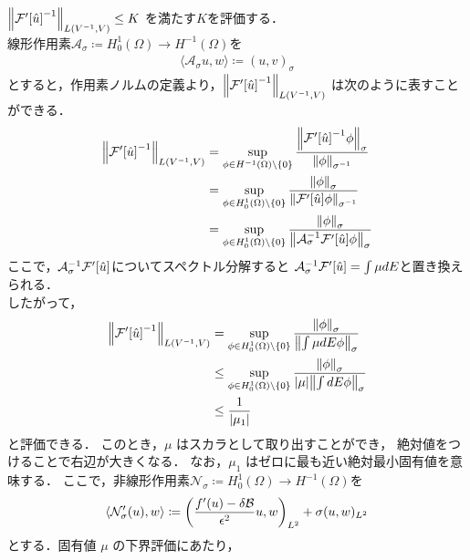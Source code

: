 \(\norm{\mathcal{F}'\qty[\hat{u}]^{-1}}_{L(V^{-1},V )} \leq K\)
を満たす\(K\)を評価する．\\
線形作用素\(\mathcal{A}_\sigma\coloneqq H^1_0(\Omega)\rightarrow H^{-1}(\Omega)\)を
\begin{align}
   \langle \mathcal{A}_\sigma u , w \rangle 
   \coloneqq (u,v)_{\sigma}
\end{align}
とすると，作用素ノルムの定義より，\(\norm{\mathcal{F}'\qty[\hat{u}]^{-1}}_{L(V^{-1},V )} \)
は次のように表すことができる．
\begin{align}
    \norm{\mathcal{F}'\qty[\hat{u}]^{-1}}_{L(V^{-1},V )} 
    &=
    \sup\limits_{\phi \in H^{-1}(\Omega) \backslash \{ 0 \} }
    \dfrac{\norm{\mathcal{F}'\qty[\hat{u}]^{-1}\phi}_\sigma }{\norm{\phi}_{\sigma ^{-1}}}\\
    &=
    \sup\limits_{\phi \in H^1_0 (\Omega)\backslash \{ 0 \} }
    \dfrac{\norm{\phi}_\sigma }{\norm{\mathcal{F}'\qty[\hat{u}]\phi}_{\sigma ^{-1}}}\\
    &=
    \sup\limits_{\phi \in H^1_0 (\Omega)\backslash \{ 0 \} }
    \dfrac{\norm{\phi}_\sigma }{\norm{ \mathcal{A}_\sigma^{-1}\mathcal{F}'\qty[\hat{u}] \phi}_\sigma }\\
\end{align}
ここで，\(\mathcal{A}_\sigma^{-1} \mathcal{F}'\qty[\hat{u}]\)についてスペクトル分解すると
\(\mathcal{A}_\sigma^{-1} \mathcal{F}'\qty[\hat{u}] = \int \mu d E\)と置き換えられる．\\
したがって，
\begin{align}
  \norm{\mathcal{F}'\qty[\hat{u}]^{-1}}_{L\qty(V^{-1},V  )} 
  &=
  \sup\limits_{\phi \in H^1_0 (\Omega)\backslash \{ 0 \} }
  \dfrac{\norm{\phi}_\sigma }{\norm{\int \mu d E\phi}_\sigma }\\
  &\leq
  \sup\limits_{\phi \in H^1_0 (\Omega)\backslash \{ 0 \} }
  \dfrac{\norm{\phi}_\sigma }{|\mu |\norm{\int d E\phi}_\sigma }\\
  &\leq
  \dfrac{1}{|\mu_1|}
\end{align}
と評価できる． このとき，\(\mu\) はスカラとして取り出すことができ，
絶対値をつけることで右辺が大きくなる．
なお，\(\mu_1\) はゼロに最も近い絶対最小固有値を意味する．
ここで，非線形作用素\(\mathcal{N}_\sigma\coloneqq H^1_0(\Omega)\rightarrow H^{-1}(\Omega)\)を
\begin{align}
  \langle \mathcal{N}^\prime_\sigma (u) , w \rangle
  \coloneqq \qty(\frac{f^\prime(u)-\delta \mathcal{B}}{\epsilon^2}u , w)_{L^2}
  +\sigma(u , w)_{L^2}
\end{align}
とする．固有値 \(\mu\) の下界評価にあたり，
